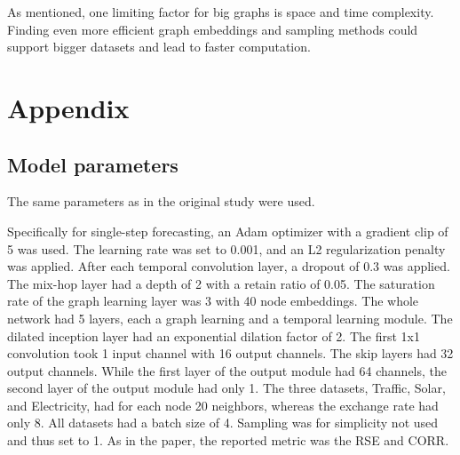\documentclass[letterpaper, twocolumn,11pt]{article}
\begin{document}
    As mentioned, one limiting factor for big graphs is space and time complexity. Finding even more efficient graph embeddings and sampling methods could support bigger datasets and lead to faster computation.



    {\footnotesize 
    }




   \section{Appendix}

   \subsection{Model parameters}\label{model_parameters}
   The same parameters as in the original study were used.

   Specifically for single-step forecasting, an Adam optimizer with a gradient clip of 5 was used.
   The learning rate was set to 0.001, and an L2 regularization penalty was applied.
   After each temporal convolution layer, a dropout of 0.3 was applied.
   The mix-hop layer had a depth of 2 with a retain ratio of 0.05.
   The saturation rate of the graph learning layer was 3 with 40 node embeddings.
   The whole network had 5 layers, each a graph learning and a temporal learning module.
   The dilated inception layer had an exponential dilation factor of 2.
   The first 1x1 convolution took 1 input channel with 16 output channels.
   The skip layers had 32 output channels.
   While the first layer of the output module had 64 channels, the second layer of the output module had only 1.
   The three datasets, Traffic, Solar, and Electricity, had for each node 20 neighbors, whereas the exchange rate had only 8.
   All datasets had a batch size of 4.
   Sampling was for simplicity not used and thus set to 1.
   As in the paper, the reported metric was the RSE and CORR.
\end{document}

